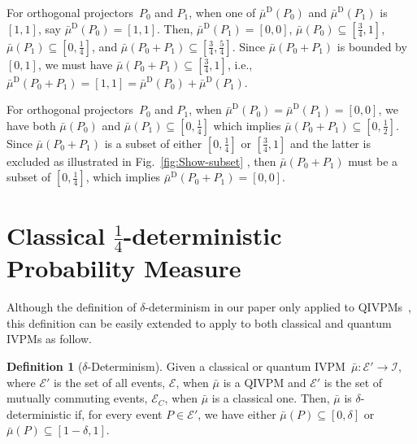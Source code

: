 \documentclass[english,reprint, aps, prl,superscriptaddress, showpacs,
showkeys, longbibliography, amsmath, amssymb, floatfix]{revtex4-1}
\theoremstyle{plain}
\theoremstyle{definition}
\newtheorem{definition}{Definition}
\newcommand{\events}{\ensuremath{\mathcal{E}}}
\newcommand{\imposs}{\ensuremath{\left[0,0\right]}}
\newcommand{\necess}{\ensuremath{\left[1,1\right]}}
\newcommand{\eventsC}{\ensuremath{\events_{C}}}
\begin{document}
For orthogonal projectors~$P_{0}$ and $P_{1}$, when one of $\bar{\mu}^{\textrm{D}}\left(P_{0}\right)$
and $\bar{\mu}^{\textrm{D}}\left(P_{1}\right)$ is $\necess$, say
$\bar{\mu}^{\textrm{D}}\left(P_{0}\right)=\necess$. Then, $\bar{\mu}^{\textrm{D}}\left(P_{1}\right)=\imposs$,
$\bar{\mu}\left(P_{0}\right)\subseteq\left[\frac{3}{4},1\right]$,
$\bar{\mu}\left(P_{1}\right)\subseteq\left[0,\frac{1}{4}\right]$,
and $\bar{\mu}\left(P_{0}+P_{1}\right)\subseteq\left[\frac{3}{4},\frac{5}{4}\right]$.
Since $\bar{\mu}\left(P_{0}+P_{1}\right)$ is bounded by $\left[0,1\right]$,
we must have $\bar{\mu}\left(P_{0}+P_{1}\right)\subseteq\left[\frac{3}{4},1\right]$,
i.e., $\bar{\mu}^{\textrm{D}}\left(P_{0}+P_{1}\right)=\necess=\bar{\mu}^{\textrm{D}}\left(P_{0}\right)+\bar{\mu}^{\textrm{D}}\left(P_{1}\right)$.

For orthogonal projectors~$P_{0}$ and $P_{1}$, when $\bar{\mu}^{\textrm{D}}\left(P_{0}\right)=\bar{\mu}^{\textrm{D}}\left(P_{1}\right)=\imposs$,
we have both $\bar{\mu}\left(P_{0}\right)$ and $\bar{\mu}\left(P_{1}\right)\subseteq\left[0,\frac{1}{4}\right]$
which implies $\bar{\mu}\left(P_{0}+P_{1}\right)\subseteq\left[0,\frac{1}{2}\right]$.
Since $\bar{\mu}\left(P_{0}+P_{1}\right)$ is a subset of either $\left[0,\frac{1}{4}\right]$
or $\left[\tfrac{3}{4},1\right]$ and the latter is excluded as illustrated
in Fig.~\ref{fig:Show-subset} , then $\bar{\mu}\left(P_{0}+P_{1}\right)$
must be a subset of $\left[0,\frac{1}{4}\right]$, which implies $\bar{\mu}^{\textrm{D}}\left(P_{0}+P_{1}\right)=\imposs$.

\section{Classical \texorpdfstring{$\frac{1}{4}$}{¼}-deterministic Probability
Measure}

Although the definition of $\delta$-determinism in our paper only
applied to QIVPMs~\cite{THOS2017}, this definition can be easily
extended to apply to both classical and quantum IVPMs as follow.

\begin{definition}[$\delta$-Determinism]\label{def:delta-deterministic}
Given a classical or quantum IVPM~$\bar{\mu}:\events'\rightarrow\mathscr{I}$,
where $\events'$ is the set of all events, $\events$, when $\bar{\mu}$
is a QIVPM and $\events'$ is the set of mutually commuting events,
$\eventsC$, when $\bar{\mu}$ is a classical one. Then, $\bar{\mu}$
is $\delta$-deterministic if, for every event $P\in\events'$, we
have either $\bar{\mu}\left(P\right)\subseteq\left[0,\delta\right]$
or $\bar{\mu}\left(P\right)\subseteq\left[1-\delta,1\right]$. \end{definition}
\end{document}
